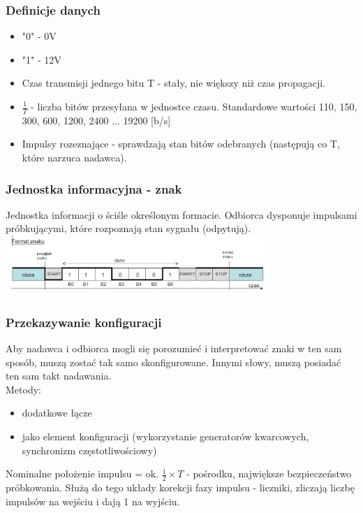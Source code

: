 		\subsubsection{Definicje danych}
		\begin{itemize}
			\item "0" - 0V
			\item "1" - 12V
			\item Czas transmisji jednego bitu T - stały, nie większy niż czas propagacji.
			\item $\frac{1}{T}$ - liczba bitów przesyłana w jednostce czasu. Standardowe wartości 110, 150, 300, 600, 1200, 2400 ... 19200 [b/s]
			\item Impulsy rozeznające - sprawdzają stan bitów odebranych (następują co T, które narzuca nadawca).
		\end{itemize}
		\subsubsection{Jednostka informacyjna - znak}
		Jednostka informacji o ściśle określonym formacie. Odbiorca dysponuje impulsami próbkującymi, które rozpoznają stan sygnału (odpytują).\\
		\includegraphics[width=10cm]{./wyklady/RS232_3_2.jpg}\\
		\subsubsection{Przekazywanie konfiguracji}
			Aby nadawca i odbiorca mogli się porozumieć i interpretować znaki w ten sam sposób, muszą zostać tak samo skonfigurowane. Innymi słowy, muszą posiadać ten sam takt nadawania.\\Metody:
			\begin{itemize}
				\item dodatkowe łącze
				\item jako element konfiguracji (wykorzystanie generatorów kwarcowych, synchronizm częstotliwościowy)
			\end{itemize}
			Nominalne położenie impulsu = ok. $\frac{1}{2}\times{T}$ - pośrodku, największe bezpieczeństwo próbkowania. Służą do tego układy korekcji fazy impulsu - liczniki, zliczają liczbę impulsów na wejściu i dają 1 na wyjściu.
